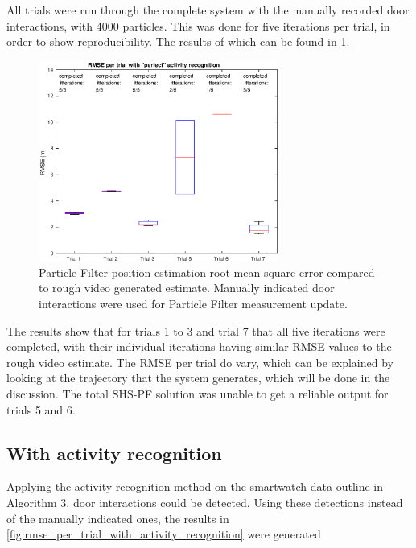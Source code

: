 All trials were run through the complete system with the manually recorded door interactions, with 4000 particles. This was done for five iterations per trial, in order to show reproducibility. The results of which can be found in \cref{fig:pf_boxplot}.

\begin{figure}[H]
	\centering
	\includegraphics[width=0.7\textwidth]{images/20201118_1212_RMSE_per_trial_with_perfect_activity_recognition}
	\caption[Particle Filter position estimation performance with manual door interaction]{Particle Filter position estimation root mean square error compared to rough video generated estimate. Manually indicated door interactions were used for Particle Filter measurement update.}	
	\label{fig:pf_boxplot}
\end{figure}

The results show that for trials 1 to 3 and trial 7 that all five iterations were completed, with their individual iterations having similar RMSE values to the rough video estimate. The RMSE per trial do vary, which can be explained by looking at the trajectory that the system generates, which will be done in the discussion. The total SHS-PF solution was unable to get a reliable output for trials 5 and 6.\par 
\newpage
\subsection{With activity recognition}

Applying the activity recognition method on the smartwatch data outline in Algorithm 3, door interactions could be detected. Using these detections instead of the manually indicated ones, the results in \cref{fig:rmse_per_trial_with_activity_recognition} were generated

